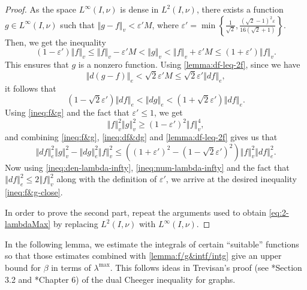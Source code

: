 \documentclass[12pt,a4paper,bold]{thesis}
\theoremstyle{definition}
\newcommand*{\norm}[2][]{\left\Vert #2 \right\Vert_{#1}}
\begin{document}
\begin{proof}
    As the space $L^{\infty}(I, \nu)$ is dense in $L^2(I, \nu)$, there exists 
    a function $g \in L^{\infty}(I, \nu)$ such that $\norm[v]{g-f} < \varepsilon'M$, 
    where $\varepsilon' = \min\left\{\frac{1}{\sqrt{2}}, \frac{(\sqrt{2} - 1)^2 \varepsilon}
    {16 (\sqrt{2} + 1)}\right\}$. Then, we get the inequality
    \begin{equation} \label{ineq:f&g}
        (1 - \varepsilon')\norm[v]{f} \leq \norm[v]{f} - \varepsilon'M
        < \norm[v]{g} < \norm[v]{f} + \varepsilon'M \leq (1 + \varepsilon')\norm[v]{f}.
    \end{equation}
    This ensures that $g$ is a nonzero function. Using \cref{lemma:df-leq-2f}, since we have 
    \begin{equation*}
        \norm[e]{d(g-f)} < \sqrt{2} \varepsilon'M \leq \sqrt{2} \varepsilon' \norm[e]{df},
    \end{equation*} 
    it follows that
    \begin{equation} \label{ineq:df&dg}
        (1 - \sqrt{2} \varepsilon')\norm[e]{df} < \norm[e]{dg} 
        < (1 + \sqrt{2} \varepsilon')\norm[e]{df}.
    \end{equation}
    Using \eqref{ineq:f&g} and the fact that $\varepsilon' \leq 1$, we get
    \begin{equation} \label{ineq:den-lambda-infty}
        \norm[v]{f}^2 \norm[v]{g}^2 \geq (1 - \varepsilon')^2 \norm[v]{f}^4,
    \end{equation}
    and combining \eqref{ineq:f&g}, \eqref{ineq:df&dg} and \cref{lemma:df-leq-2f} 
    gives us that
    \begin{equation} \label{ineq:num-lambda-infty}
        \norm[e]{df}^2 \norm[v]{g}^2 - \norm[e]{dg}^2 \norm[v]{f}^2 \leq ((1 + \varepsilon')^2 
        - (1 - \sqrt{2} \varepsilon')^2) \norm[v]{f}^2 \norm[e]{df}^2.
    \end{equation} 
    Now using \eqref{ineq:den-lambda-infty}, \eqref{ineq:num-lambda-infty} and the fact 
    that $\norm[e]{df}^2 \leq 2\norm[v]{f}^2$ along with the definition of $\varepsilon'$, 
    we arrive at the desired inequality \eqref{ineq:f&g-close}. 

    In order to prove the second part, repeat the arguments used to obtain 
    \cref{eq:2-lambdaMax} by replacing $L^2(I, \nu)$ with $L^{\infty}(I, \nu)$.
\end{proof}

In the following lemma, we estimate the integrals of certain ``suitable'' functions 
so that those estimates combined with \cref{lemma:f/g&intf/intg} give an upper bound 
for $\beta$ in terms of $\lambda^{\max}$. This follows ideas in Trevisan's proof 
(see \cite{Trevisan-MaxCut12}*{Section 3.2} and \cite{Trevisan-notes-expanders}*{Chapter 6}) 
of the dual Cheeger inequality for graphs. 
\end{document}
